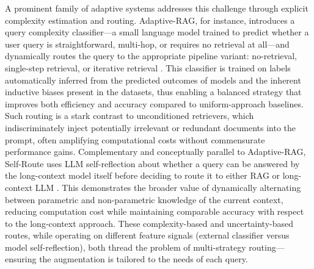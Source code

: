 \documentclass[11pt,a4paper]{article}
\begin{document}
A prominent family of adaptive systems addresses this challenge through explicit complexity estimation and routing. Adaptive-RAG, for instance, introduces a query complexity classifier---a small language model trained to predict whether a user query is straightforward, multi-hop, or requires no retrieval at all---and dynamically routes the query to the appropriate pipeline variant: no-retrieval, single-step retrieval, or iterative retrieval \cite{arxiv:2403.14403v2}. This classifier is trained on labels automatically inferred from the predicted outcomes of models and the inherent inductive biases present in the datasets, thus enabling a balanced strategy that improves both efficiency and accuracy compared to uniform-approach baselines. Such routing is a stark contrast to unconditioned retrievers, which indiscriminately inject potentially irrelevant or redundant documents into the prompt, often amplifying computational costs without commensurate performance gains. Complementary and conceptually parallel to Adaptive-RAG, Self-Route uses LLM self-reflection about whether a query can be answered by the long-context model itself before deciding to route it to either RAG or long-context LLM \cite{arxiv:2407.16833v1}. This demonstrates the broader value of dynamically alternating between parametric and non-parametric knowledge of the current context, reducing computation cost while maintaining comparable accuracy with respect to the long-context approach. These complexity-based and uncertainty-based routes, while operating on different feature signals (external classifier versus model self-reflection), both thread the problem of multi-strategy routing---ensuring the augmentation is tailored to the needs of each query.
\end{document}
